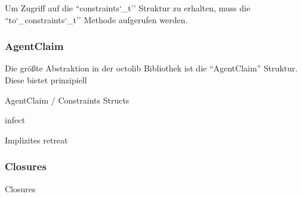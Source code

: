 Um Zugriff auf die ``constraints\char`_t'' Struktur zu erhalten, muss die ``to\char`_constraints\char`_t'' Methode aufgerufen werden.

\subsubsection{AgentClaim}

Die größte Abstraktion in der octolib Bibliothek ist die ``AgentClaim'' Struktur. Diese bietet prinzipiell


AgentClaim / Constraints Structs

infect

Implizites retreat

\subsubsection{Closures}

Closures

